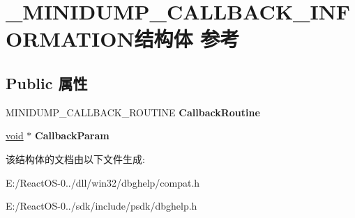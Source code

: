 \hypertarget{struct___m_i_n_i_d_u_m_p___c_a_l_l_b_a_c_k___i_n_f_o_r_m_a_t_i_o_n}{}\section{\+\_\+\+M\+I\+N\+I\+D\+U\+M\+P\+\_\+\+C\+A\+L\+L\+B\+A\+C\+K\+\_\+\+I\+N\+F\+O\+R\+M\+A\+T\+I\+O\+N结构体 参考}
\label{struct___m_i_n_i_d_u_m_p___c_a_l_l_b_a_c_k___i_n_f_o_r_m_a_t_i_o_n}
\subsection*{Public 属性}
\begin{DoxyCompactItemize}
\item 
\mbox{\label{struct___m_i_n_i_d_u_m_p___c_a_l_l_b_a_c_k___i_n_f_o_r_m_a_t_i_o_n_a46f184aeb3986429f8c14f98e9ed253d}} 
M\+I\+N\+I\+D\+U\+M\+P\+\_\+\+C\+A\+L\+L\+B\+A\+C\+K\+\_\+\+R\+O\+U\+T\+I\+NE {\bfseries Callback\+Routine}
\item 
\mbox{\label{struct___m_i_n_i_d_u_m_p___c_a_l_l_b_a_c_k___i_n_f_o_r_m_a_t_i_o_n_ad977f98b55ba864bd449d8b7dd542dba}} 
\hyperlink{interfacevoid}{void} $\ast$ {\bfseries Callback\+Param}
\end{DoxyCompactItemize}


该结构体的文档由以下文件生成\+:\begin{DoxyCompactItemize}
\item 
E\+:/\+React\+O\+S-\/0../dll/win32/dbghelp/compat.\+h\item 
E\+:/\+React\+O\+S-\/0../sdk/include/psdk/dbghelp.\+h\end{DoxyCompactItemize}
